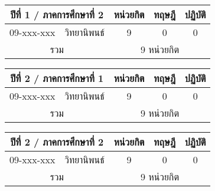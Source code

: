 \vspace{5ex}\par\noindent 
\renewcommand{\arraystretch}{1.4}
\begin{tabular}{|cp{}|ccc|}
\hline
\multicolumn{2}{|c|}{ปีที่ 1 / ภาคการศึกษาที่ 2} & \multicolumn{1}{c|}{หน่วยกิต} & \multicolumn{1}{c|}{ทฤษฎี} & \multicolumn{1}{c|}{ปฏิบัติ}  \\ \hline
\multicolumn{1}{|c|}{09-xxx-xxx}  & วิทยานิพนธ์  & \multicolumn{1}{c|}{9}        & \multicolumn{1}{c|}{0}     & \multicolumn{1}{c|}{0}                    \\ \hline
\multicolumn{2}{|c|}{รวม}                        & \multicolumn{3}{c|}{9 หน่วยกิต}                                                                            \\ \hline
\end{tabular}

\vspace{5ex}\par\noindent 
\renewcommand{\arraystretch}{1.4}
\begin{tabular}{|cp{}|ccc|}
\hline
\multicolumn{2}{|c|}{ปีที่ 2 / ภาคการศึกษาที่ 1} & \multicolumn{1}{c|}{หน่วยกิต} & \multicolumn{1}{c|}{ทฤษฎี} & \multicolumn{1}{c|}{ปฏิบัติ}  \\ \hline
\multicolumn{1}{|c|}{09-xxx-xxx}  & วิทยานิพนธ์  & \multicolumn{1}{c|}{9}        & \multicolumn{1}{c|}{0}     & \multicolumn{1}{c|}{0}                    \\ \hline
\multicolumn{2}{|c|}{รวม}                        & \multicolumn{3}{c|}{9 หน่วยกิต}                                                                            \\ \hline
\end{tabular}

\vspace{5ex}\par\noindent 
\renewcommand{\arraystretch}{1.4}
\begin{tabular}{|cp{}|ccc|}
\hline
\multicolumn{2}{|c|}{ปีที่ 2 / ภาคการศึกษาที่ 2} & \multicolumn{1}{c|}{หน่วยกิต} & \multicolumn{1}{c|}{ทฤษฎี} & \multicolumn{1}{c|}{ปฏิบัติ}  \\ \hline
\multicolumn{1}{|c|}{09-xxx-xxx}  & วิทยานิพนธ์  & \multicolumn{1}{c|}{9}        & \multicolumn{1}{c|}{0}     & \multicolumn{1}{c|}{0}                   \\ \hline
\multicolumn{2}{|c|}{รวม}                        & \multicolumn{3}{c|}{9 หน่วยกิต}                                                                            \\ \hline
\end{tabular}


